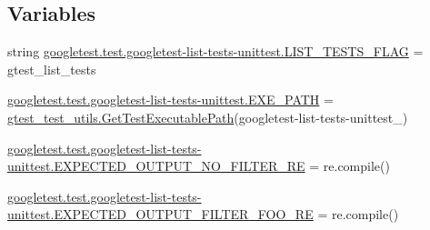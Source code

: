 \subsection*{Variables}
\begin{DoxyCompactItemize}
\item 
string \mbox{\hyperlink{namespacegoogletest_1_1test_1_1googletest-list-tests-unittest_ac13f3f3e52740d2ff932a559ea136bfb}{googletest.\+test.\+googletest-\/list-\/tests-\/unittest.\+L\+I\+S\+T\+\_\+\+T\+E\+S\+T\+S\+\_\+\+F\+L\+AG}} = \textquotesingle{}gtest\+\_\+list\+\_\+tests\textquotesingle{}
\item 
\mbox{\hyperlink{namespacegoogletest_1_1test_1_1googletest-list-tests-unittest_a9a0acaf8ecd0209c30404d614b02bc3c}{googletest.\+test.\+googletest-\/list-\/tests-\/unittest.\+E\+X\+E\+\_\+\+P\+A\+TH}} = \mbox{\hyperlink{namespacegtest__test__utils_a89ed3717984a80ffbb7a9c92f71b86a2}{gtest\+\_\+test\+\_\+utils.\+Get\+Test\+Executable\+Path}}(\textquotesingle{}googletest-\/list-\/tests-\/unittest\+\_\+\textquotesingle{})
\item 
\mbox{\hyperlink{namespacegoogletest_1_1test_1_1googletest-list-tests-unittest_a5ef057450e781cb73cf87e99bb406109}{googletest.\+test.\+googletest-\/list-\/tests-\/unittest.\+E\+X\+P\+E\+C\+T\+E\+D\+\_\+\+O\+U\+T\+P\+U\+T\+\_\+\+N\+O\+\_\+\+F\+I\+L\+T\+E\+R\+\_\+\+RE}} = re.\+compile()
\item 
\mbox{\hyperlink{namespacegoogletest_1_1test_1_1googletest-list-tests-unittest_aecc28862da1c50189306a3476bff9d6f}{googletest.\+test.\+googletest-\/list-\/tests-\/unittest.\+E\+X\+P\+E\+C\+T\+E\+D\+\_\+\+O\+U\+T\+P\+U\+T\+\_\+\+F\+I\+L\+T\+E\+R\+\_\+\+F\+O\+O\+\_\+\+RE}} = re.\+compile()
\end{DoxyCompactItemize}
